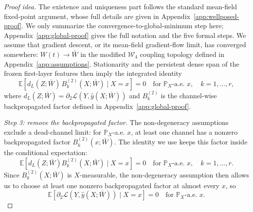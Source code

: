 \documentclass{article}
\newcommand{\E}{\mathbb{E}}
\newcommand{\Pp}{\mathbb{P}}
\newcommand{\calL}{\mathcal{L}}
\begin{document}
\begin{proof}[Proof idea]
The existence and uniqueness part follows the standard mean-field fixed-point argument, whose full details are given in Appendix~\ref{app:wellposed-proof}. We only summarize the convergence-to-global-minimum step here; Appendix~\ref{app:global-proof} gives the full notation and the five formal steps. We assume that gradient descent, or its mean-field gradient-flow limit, has converged somewhere: $W(t)\to\bar W$ in the modified $\mathcal W_4$ coupling topology defined in Appendix~\ref{app:assumptions}. Stationarity and the persistent dense span of the frozen first-layer features then imply the integrated identity
\begin{equation}
\E\!\left[
d_L(Z;\bar W)\,B_k^{(2)}(X;\bar W)
\mid X=x
\right]=0
\quad\text{for }\Pp_X\text{-a.e. }x,\quad k=1,\ldots,r,
\label{eq:proofidea-dense-product}
\end{equation}
where $d_L(Z;\bar W)=\partial_2\calL(Y,\hat y(X;\bar W))$ and $B_k^{(2)}$ is the channel-wise backpropagated factor defined in Appendix~\ref{app:global-proof}.

\emph{Step 3: remove the backpropagated factor.}
The non-degeneracy assumptions exclude a dead-channel limit: for $\Pp_X$-a.e. $x$, at least one channel has a nonzero backpropagated factor $B_k^{(2)}(x;\bar W)$. The identity we use keeps this factor inside the conditional expectation:
\[
\E\!\left[
d_L(Z;\bar W)B_k^{(2)}(X;\bar W)
\mid X=x
\right]=0
\quad\text{for }\Pp_X\text{-a.e. }x,\quad k=1,\ldots,r.
\]
Since $B_k^{(2)}(X;\bar W)$ is $X$-measurable, the non-degeneracy assumption then allows us to choose at least one nonzero backpropagated factor at almost every $x$, so
\begin{equation}
\E\!\left[
\partial_2\calL\left(Y,\hat y(X;\bar W)\right)
\mid X=x
\right]=0
\quad\text{for }\Pp_X\text{-a.e. }x.
\label{eq:proofidea-conditional-zero}
\end{equation}


\end{proof}
\end{document}
